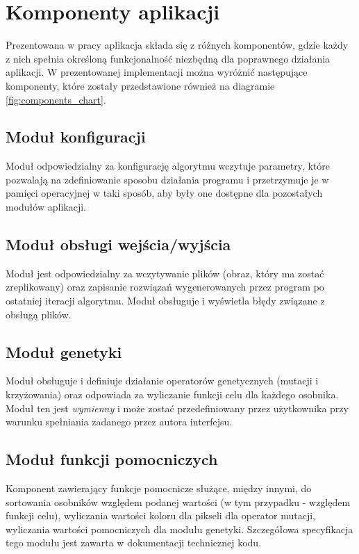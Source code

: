 \section{Komponenty aplikacji}
\label{sec:components_desc}
Prezentowana w pracy aplikacja składa się z różnych komponentów, gdzie każdy z nich spełnia określoną funkcjonalność niezbędną dla poprawnego działania aplikacji. W prezentowanej implementacji można wyróżnić następujące komponenty, które zostały przedstawione również na diagramie \ref{fig:components_chart}.

\subsection{Moduł konfiguracji}
\label{subsec:configuration_module}
Moduł odpowiedzialny za konfigurację algorytmu wczytuje parametry, które pozwalają na zdefiniowanie sposobu działania programu i przetrzymuje je w pamięci operacyjnej w taki sposób, aby były one dostępne dla pozostałych modułów aplikacji. 

\subsection{Moduł obsługi wejścia/wyjścia}
\label{subsec:io_module}
Moduł jest odpowiedzialny za wczytywanie plików (obraz, który ma zostać zreplikowany) oraz zapisanie rozwiązań wygenerowanych przez program po ostatniej iteracji algorytmu. Moduł obsługuje i wyświetla błędy związane z obsługą plików.

\subsection{Moduł genetyki}
\label{subsec:genetics_module}
Moduł obsługuje i definiuje działanie operatorów genetycznych (mutacji i krzyżowania) oraz odpowiada za wyliczanie funkcji celu dla każdego osobnika. Moduł ten jest \textit{wymienny} i może zostać przedefiniowany przez użytkownika przy warunku spełniania zadanego przez autora interfejsu.

\subsection{Moduł funkcji pomocniczych}
\label{subsec:helpers_module}
Komponent zawierający funkcje pomocnicze służące, między innymi, do sortowania osobników względem podanej wartości (w tym przypadku - względem funkcji celu), wyliczania wartości koloru dla pikseli dla operator mutacji, wyliczania wartości pomocniczych dla modułu genetyki. Szczegółowa specyfikacja tego modułu jest zawarta w dokumentacji technicznej kodu.

